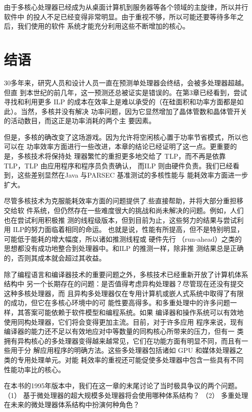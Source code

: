 由于多核心处理器已经成为从桌面计算机到服务器等各个领域的主旋律，所以并行软件中
的投人不足已经变得非常明显。由于重视不够，所以可能还要等待多年之后，我们使用的软件
系统才能充分利用这些不断增加的核心。

\section{结语}
30多年来，研究人员和设计人员一直在预测单处理器会终结，会被多处理器超越。但直
到本世纪的前几年，这一预测还总被证实是错误的。在第3章已经看到，尝试寻找和利用更多
ILP 的成本在效率上是难以承受的（在硅面积和功率方面都是如此）。当然，多核并没有解决
功率问题，因为它显然增加了晶体管数和晶体管开关的活动数目，而这正是功率消耗的两个主
要因素。

但是，多核的确改变了这场游戏。因为允许将空闲核心置于功率节省模式，所以也可以在
功率效率方面进行一些改进，本章的结论已经证明了这一点。更重要的是，多核技术将保持处
理器繁忙的重担更多地交给了 TLP，而不再是依靠 TLP，TLP 由应用程序和程序员负责确认，
而ILP 则由硬件负责。我们已经看到，这些差别显然在Java 与PARSEC 基准测试的多核性能与
能耗效率方面进一步扩大。

尽管多核技术为克服能耗效率方面的问题提供了.些直接帮助，并将大部分重担移交给软
件系统，但仍然存在一些难度很大的挑战和尚未解决的问题。例如，人们也在尝试利用积极推
测的线程级版本，但到目前为止，这些努力的结果与尝试利用 ILP的努力面临着相同的命运。
也就是说，性能有所提高，但不是特别明显，可能低于能耗的增大幅度，所以诸如推测线程或
硬件先行 （run-ahead）之类的思想都没有成功地整合到处理器中。和ILP 的推测一样，除非推
测结果总是正确的，否则其成本就会超过其收益。

除了编程语言和编译器技术的重要问题之外，多核技术已经重新开放了计算机体系结构中
另一个长期存在的问题：是否值得考虑异构处理器？尽管现在还没有提交这种多核处理器，而
且异构多处理器仅在专用计算机或嵌人式系统中取得了有限的成功，但它在多核心环境中的可
能性要高得多。和多重处理中的许多问题一样，其答案可能依赖于软件模型和编程系统。如果
编译器和操作系统可以有效地使用同构处理器，它们将会变得更加主流。目前，对于许多应用
程序来说，现有编译器的能力还不足以有效地应对中等数量的同构核心所带来的压力，但有一
类拥有异构核心的多处理器变得越来越常见，它们在功能方面有明显不同，而且有一些用于分
解应用程序的明确方法。这些多处理器包括诸如 GPU 和媒体处理器之类的专用处理单元。对能
耗效率的重视还可能促使多处理器中包含一些具有不同性能功率比的核心。

在本书的1995年版本中，我们在这一章的末尾讨论了当时极具争议的两个问题。
（1） 基于微处理器的超大规模多处理器将会使用哪种体系结构？
（2） 多重处理在未来的微处理器体系结构中扮演何种角色？

